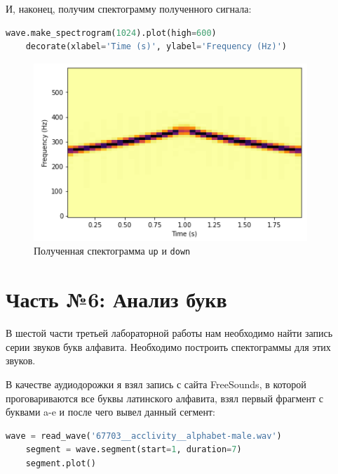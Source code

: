 \documentclass[a4paper]{article}
\begin{document}
            И, наконец, получим спектограмму полученного сигнала:
            
\begin{lstlisting}[language=Python, caption= Спектограмма сигнала \texttt{up} и \texttt{down}]
    wave.make_spectrogram(1024).plot(high=600)
    decorate(xlabel='Time (s)', ylabel='Frequency (Hz)')
\end{lstlisting}   
            
             \begin{figure}[H]
                \centering
                \includegraphics{ex_5_signal_up_down_spectogramma.png}
                \caption{Полученная спектограмма \texttt{up} и \texttt{down}}
                \label{fig:ex_5_signal_up_down_spectogramma}
            \end{figure}
           
    \newpage
        \section{Часть №6: Анализ букв}   
            В шестой части третьей лабораторной работы нам необходимо найти запись серии звуков букв алфавита. Необходимо построить спектограммы для этих звуков.
            
            В качестве аудиодорожки я взял запись с сайта FreeSounds, в которой проговариваются все буквы латинского алфавита, взял первый фрагмент с буквами a-e и после чего вывел данный сегмент:
            
\begin{lstlisting}[language=Python, caption= Вывод сегмента]
    wave = read_wave('67703__acclivity__alphabet-male.wav')
    segment = wave.segment(start=1, duration=7)
    segment.plot()
\end{lstlisting}   
            
\end{document}

